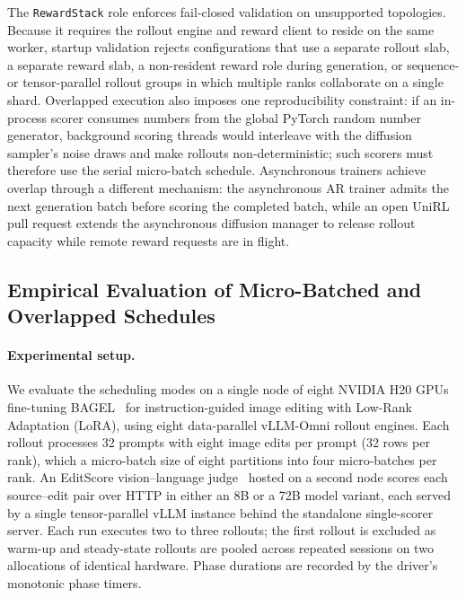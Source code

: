 The \texttt{RewardStack} role enforces fail-closed validation on unsupported topologies.
Because it requires the rollout engine and reward client to reside on the same worker, startup validation rejects configurations that use a separate rollout slab, a separate reward slab, a non-resident reward role during generation, or sequence- or tensor-parallel rollout groups in which multiple ranks collaborate on a single shard.
Overlapped execution also imposes one reproducibility constraint: if an in-process scorer consumes numbers from the global PyTorch random number generator, background scoring threads would interleave with the diffusion sampler's noise draws and make rollouts non-deterministic; such scorers must therefore use the serial micro-batch schedule.
Asynchronous trainers achieve overlap through a different mechanism: the asynchronous AR trainer admits the next generation batch before scoring the completed batch, while an open UniRL pull request extends the asynchronous diffusion manager to release rollout capacity while remote reward requests are in flight.

\subsection{Empirical Evaluation of Micro-Batched and Overlapped Schedules}
\label{sec:reward-results}

\paragraph{Experimental setup.}
We evaluate the scheduling modes on a single node of eight NVIDIA H20 GPUs fine-tuning BAGEL~\citep{deng2025bagel} for instruction-guided image editing with Low-Rank Adaptation (LoRA), using eight data-parallel vLLM-Omni rollout engines.
Each rollout processes 32 prompts with eight image edits per prompt (32 rows per rank), which a micro-batch size of eight partitions into four micro-batches per rank.
An EditScore vision--language judge~\citep{luo2025editscore} hosted on a second node scores each source--edit pair over HTTP in either an 8B or a 72B model variant, each served by a single tensor-parallel vLLM instance behind the standalone single-scorer server.
Each run executes two to three rollouts; the first rollout is excluded as warm-up and steady-state rollouts are pooled across repeated sessions on two allocations of identical hardware.
Phase durations are recorded by the driver's monotonic phase timers.

